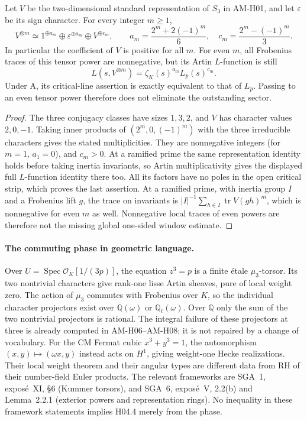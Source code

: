 \begin{proposition}
\label{AC-K08}
Let $V$ be the two-dimensional standard representation of
$S_3$ in AM-H01, and let $\varepsilon$ be its sign character.
For every integer $m\ge1$,
\[
 V^{\otimes m}\simeq
    1^{\oplus a_m}\oplus\varepsilon^{\oplus a_m}
                           \oplus V^{\oplus c_m},\qquad
 a_m=\frac{2^m+2(-1)^m}{6},\quad
 c_m=\frac{2^m-(-1)^m}{3}.
\]
In particular the coefficient of $V$ is positive for all $m$.
For even $m$, all Frobenius traces of this tensor power are
nonnegative, but its Artin $L$-function is still
\[
 L(s,V^{\otimes m})=\zeta_K(s)^{a_m}L_p(s)^{c_m}.
\]
Under A, its critical-line assertion is exactly equivalent
to that of $L_p$. Passing to an even tensor power therefore
does not eliminate the outstanding sector.
\end{proposition}
\begin{proof}
The three conjugacy classes have sizes $1,3,2$, and $V$ has
character values $2,0,-1$. Taking inner products of
$(2^m,0,(-1)^m)$ with the three irreducible characters gives
the stated multiplicities. They are nonnegative integers
(for $m=1$, $a_1=0$), and $c_m>0$. At a ramified prime the
same representation identity holds before taking inertia
invariants, so Artin multiplicativity gives the displayed
full $L$-function identity there too. All its factors have
no poles in the open critical strip, which proves the last
assertion. At a ramified prime, with inertia group $I$ and a
Frobenius lift $g$, the trace on invariants is
$|I|^{-1}\sum_{h\in I}\operatorname{tr}V(gh)^{m}$, which is
nonnegative for even $m$ as well. Nonnegative local traces of even powers are
therefore not the missing global one-sided window estimate.
\end{proof}

\paragraph{The commuting phase in geometric language.}
Over $U=\operatorname{Spec}\mathcal O_K[1/(3p)]$, the equation
$z^3=p$ is a finite \'etale $\mu_3$-torsor. Its two nontrivial
characters give rank-one lisse Artin sheaves, pure of local
weight zero. The action of $\mu_3$ commutes with Frobenius
over $K$, so the individual character projectors exist over
$\mathbb Q(\omega)$ or $\mathbb Q_\ell(\omega)$. Over
$\mathbb Q$ only the sum of the two nontrivial projectors is rational.
The integral failure of these projectors at three is already
computed in AM-H06--AM-H08; it is not repaired by a change
of vocabulary. For the CM Fermat cubic $x^3+y^3=1$, the
automorphism $(x,y)\mapsto(\omega x,y)$ instead acts on
$H^1$, giving weight-one Hecke realizations. Their local
weight theorem and their angular types are different data
from RH of their number-field Euler products. The relevant
frameworks are SGA~1, expos\'e~XI, \S6 (Kummer torsors),
and SGA~6, expos\'e~V, 2.2(b) and Lemma~2.2.1 (exterior
powers and representation rings). No inequality in these
framework statements implies H04.4 merely from the phase.

